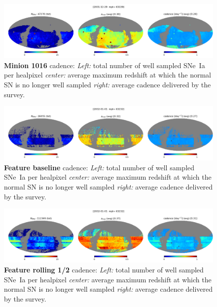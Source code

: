\begin{figure}[h!]
  \begin{center}
    \includegraphics[width=\linewidth]{Figures/minion_1016_64_maps.png}
    \caption{{\bf Minion 1016} cadence: {\em Left:} total number of well
      sampled SNe~Ia per healpixel {\em center:} average maximum
      redshift at which the normal SN is no longer well sampled {\em
        right:} average cadence delivered by the survey.}
  \end{center}
\end{figure}

\begin{figure}[h!]
  \begin{center}
    \includegraphics[width=\linewidth]{Figures/feature_baseline_10yrs_64_maps.png}
    \caption{{\bf Feature baseline} cadence: {\em Left:} total number of well
      sampled SNe~Ia per healpixel {\em center:} average maximum
      redshift at which the normal SN is no longer well sampled {\em
        right:} average cadence delivered by the survey.}
  \end{center}
\end{figure}

\begin{figure}[h!]
  \begin{center}
    \includegraphics[width=\linewidth]{Figures/feature_rolling_half_mask_10yrs_64_maps.png}
    \caption{{\bf Feature rolling 1/2} cadence: {\em Left:} total number of well
      sampled SNe~Ia per healpixel {\em center:} average maximum
      redshift at which the normal SN is no longer well sampled {\em
        right:} average cadence delivered by the survey.}
  \end{center}
\end{figure}


